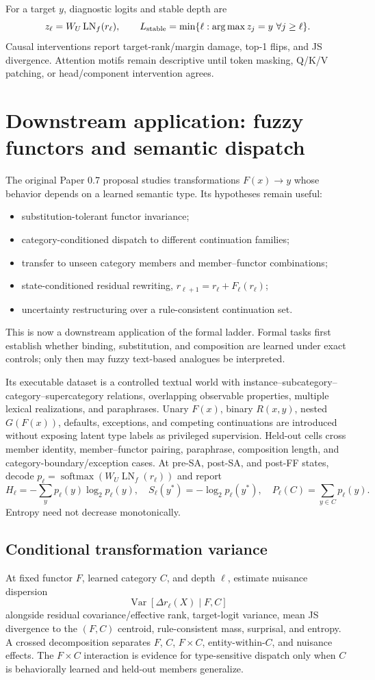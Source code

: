 \documentclass[10pt]{article}
\begin{document}
For a target $y$, diagnostic logits and stable depth are
\[
z_\ell=W_U\operatorname{LN}_f(r_\ell),\qquad
L_{\rm stable}=\min\{\ell:\arg\max z_j=y\ \forall j\ge\ell\}.
\]
Causal interventions report target-rank/margin damage, top-1 flips, and JS divergence. Attention motifs remain descriptive until token masking, Q/K/V patching, or head/component intervention agrees.

\section{Downstream application: fuzzy functors and semantic dispatch}
The original Paper 0.7 proposal studies transformations $F(x)\rightarrow y$ whose behavior depends on a learned semantic type. Its hypotheses remain useful:
\begin{itemize}
\item substitution-tolerant functor invariance;
\item category-conditioned dispatch to different continuation families;
\item transfer to unseen category members and member--functor combinations;
\item state-conditioned residual rewriting, $r_{\ell+1}=r_\ell+F_\ell(r_\ell)$;
\item uncertainty restructuring over a rule-consistent continuation set.
\end{itemize}
This is now a downstream application of the formal ladder. Formal tasks first establish whether binding, substitution, and composition are learned under exact controls; only then may fuzzy text-based analogues be interpreted.

Its executable dataset is a controlled textual world with instance--subcategory--category--supercategory relations, overlapping observable properties, multiple lexical realizations, and paraphrases. Unary $F(x)$, binary $R(x,y)$, nested $G(F(x))$, defaults, exceptions, and competing continuations are introduced without exposing latent type labels as privileged supervision. Held-out cells cross member identity, member--functor pairing, paraphrase, composition length, and category-boundary/exception cases. At pre-SA, post-SA, and post-FF states, decode $p_\ell=\operatorname{softmax}(W_U\operatorname{LN}_f(r_\ell))$ and report
\[
H_\ell=-\sum_y p_\ell(y)\log_2p_\ell(y),\quad S_\ell(y^*)=-\log_2p_\ell(y^*),\quad P_\ell(C)=\sum_{y\in C}p_\ell(y).
\]
Entropy need not decrease monotonically.

\subsection{Conditional transformation variance}
At fixed functor $F$, learned category $C$, and depth $\ell$, estimate nuisance dispersion
\[
\operatorname{Var}[\Delta r_\ell(X)\mid F,C]
\]
alongside residual covariance/effective rank, target-logit variance, mean JS divergence to the $(F,C)$ centroid, rule-consistent mass, surprisal, and entropy. A crossed decomposition separates $F$, $C$, $F\times C$, entity-within-$C$, and nuisance effects. The $F\times C$ interaction is evidence for type-sensitive dispatch only when $C$ is behaviorally learned and held-out members generalize.
\end{document}
